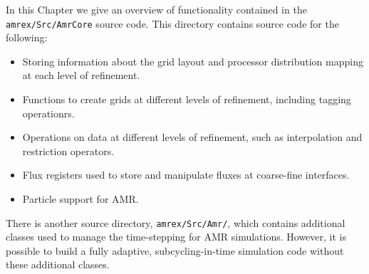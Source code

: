 In this Chapter we give an overview of functionality contained in the {\tt amrex/Src/AmrCore} source code.
This directory contains source code for the following:
\begin{itemize}
\item Storing information about the grid layout and processor distribution mapping
at each level of refinement.
\item Functions to create grids at different levels of refinement, including tagging
operationrs.
\item Operations on data at different levels of refinement, such as interpolation and
restriction operators.
\item Flux registers used to store and manipulate fluxes at coarse-fine interfaces.
\item Particle support for AMR.
\end{itemize}
There is another source directory, {\tt amrex/Src/Amr/}, which contains
additional classes used to manage the time-stepping for AMR simulations.
However, it is possible to build a fully adaptive, subcycling-in-time simulation code
without these additional classes.

